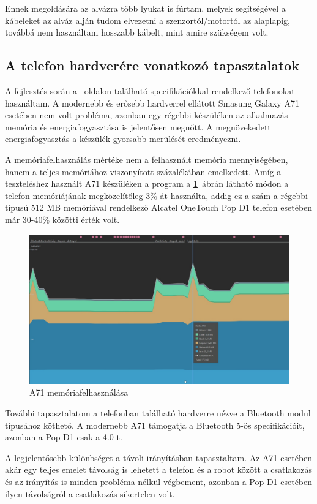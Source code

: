 \documentclass[]{thesis-ekf}
\theoremstyle{definition}
\begin{document}
Ennek megoldására az alvázra több lyukat is fúrtam, melyek segítségével a kábeleket az alváz alján tudom elvezetni a szenzortól/motortól az alaplapig, továbbá nem használtam hosszabb kábelt, mint amire szükségem volt.
\subsection{A telefon hardverére vonatkozó tapasztalatok}\label{phone_hardware}
A fejlesztés során a \pageref{telefonok}~oldalon található specifikációkkal rendelkező telefonokat használtam. A modernebb és erősebb hardverrel ellátott Smasung Galaxy A71 esetében nem volt probléma, azonban egy régebbi készüléken az alkalmazás memória és energiafogyasztása is jelentősen megnőtt. A megnövekedett energiafogyasztás a készülék gyorsabb merülését eredményezni.

A memóriafelhasználás mértéke nem a felhasznált memória mennyiségében, hanem a teljes memóriához viszonyított százalékában emelkedett. Amíg a teszteléshez használt A71 készüléken a program a \ref{ram_usage}~ábrán látható módon a telefon memóriájának megközelítőleg 3\%-át használta, addig ez a szám a régebbi típusú 512 MB memóriával rendelkező Alcatel OneTouch Pop D1 telefon esetében már 30-40\% közötti érték volt.
\begin{figure}[h]
	\centering
	\includegraphics[width=\columnwidth]{images/ram_usage}
	\caption{A71 memóriafelhasználása}
	\label{ram_usage}
\end{figure}

További tapasztalatom a telefonban található hardverre nézve a Bluetooth modul típusához köthető. A modernebb A71 támogatja a Bluetooth 5-ös specifikációit, azonban a Pop D1 csak a 4.0-t.

A legjelentősebb különbséget a távoli irányításban tapasztaltam. Az A71 esetében akár egy teljes emelet távolság is lehetett a telefon és a robot között a csatlakozás és az irányítás is minden probléma nélkül végbement, azonban a Pop D1 esetében ilyen távolságról a csatlakozás sikertelen volt.
\end{document}
